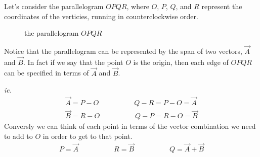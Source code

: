 \documentclass[main.tex]{subfiles}
\begin{document}

Let's consider the parallelogram $OPQR$, where $O$, $P$, $Q$, and $R$
represent the coordinates of the verticies, running in counterclockwise
order.

\begin{figure}[!h]
\centering
{}
\caption{the parallelogram $OPQR$}
\end{figure}

Notice that the parallelogram can be represented by the span of two vectors,
$\vec{A}$ and $\vec{B}$.
In fact if we say that the point $O$ is the origin, then each edge of $OPQR$
can be specified in terms of $\vec{A}$ and $\vec{B}$.


\begin{tcolorbox}[boxsep=.5mm, boxrule=.1pt]
\textit{ie.}\\
\begin{align*}
\vec{A} = P - O \hspace{5em}
Q-R = P-O = \vec{A}\\
\vec{B} = R - O\hspace{5em}
Q-P = R-O = \vec{B}
\end{align*}
\tcblower
Conversly we can think of each point in terms of the vector combination we need to
add to $O$ in order to get to that point.
\begin{align*}
P = \vec{A} \hspace{5em}
R = \vec{B} \hspace{5em}
Q = \vec{A} + \vec{B}
\end{align*}
\end{tcolorbox}
\end{document}

